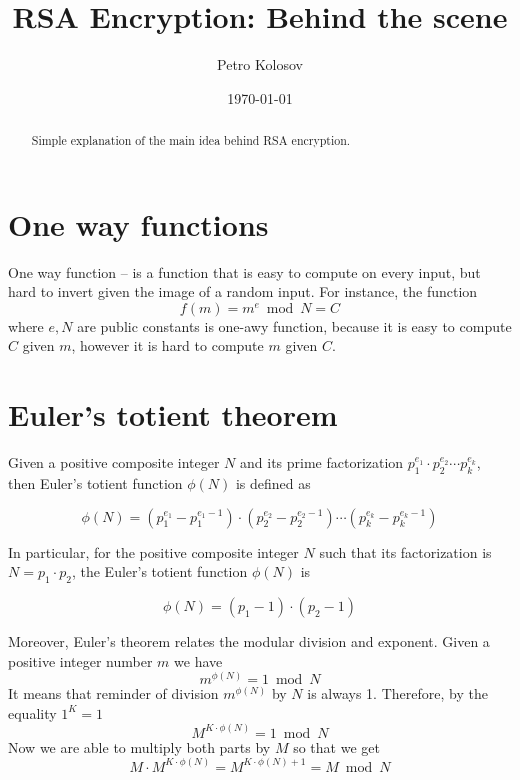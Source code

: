 \documentclass[12pt,letterpaper,oneside,reqno]{amsart}
\title[RSA Encryption: Behind the scene]{RSA Encryption: Behind the scene}
\author[Petro Kolosov]{Petro Kolosov}
\date{\today}
\begin{document}
    \begin{abstract}
        Simple explanation of the main idea behind RSA encryption.
    \end{abstract}
    \maketitle
    \tableofcontents


    \section{One way functions}\label{sec:one-way-functions}
    One way function -- is a function that is easy to compute on every input, but
    hard to invert given the image of a random input.
    For instance, the function
    \begin{equation*}
        f(m) = m^e \bmod N = C
    \end{equation*}
    where $e, N$ are public constants is one-awy function,
    because it is easy to compute $C$ given $m$, however it is hard to compute $m$ given $C$.


    \section{Euler's totient theorem}\label{sec:euler's-totient-theorem}
    Given a positive composite integer $N$ and its prime factorization $p_1^{e_1}\cdot p_2^{e_2} \cdots p_k^{e_k}$,
    then Euler's totient function $\phi(N)$ is defined as

    \begin{equation}
        \phi(N) = (p_1^{e_1} - p_1^{e_1 - 1}) \cdot (p_2^{e_2} - p_2^{e_2 - 1}) \cdots (p_k^{e_k} - p_k^{e_k - 1})
        \label{eq:euler-totient-theorem}
    \end{equation}

    In particular, for the positive composite integer $N$ such that its factorization is $N = p_1 \cdot p_2$,
    the Euler's totient function $\phi(N)$ is

    \begin{equation}
        \phi(N) = (p_1 -1) \cdot (p_2 - 1)\label{eq:euler-theorem-partial}
    \end{equation}

    Moreover, Euler's theorem relates the modular division and exponent.
    Given a positive integer number $m$ we have
    \begin{equation}
        m^{\phi(N)} = 1 \bmod N\label{eq:euler-theorem-modular}
    \end{equation}
    It means that reminder of division $m^{\phi(N)}$ by $N$ is always 1.
    Therefore, by the equality $1^K = 1$
    \[
        M^{K \cdot \phi(N)} = 1 \bmod N
    \]
    Now we are able to multiply both parts by $M$ so that we get
    \[
        M \cdot M^{K \cdot \phi(N)} = M^{K \cdot \phi(N) + 1} = M \bmod N
    \]
\end{document}

